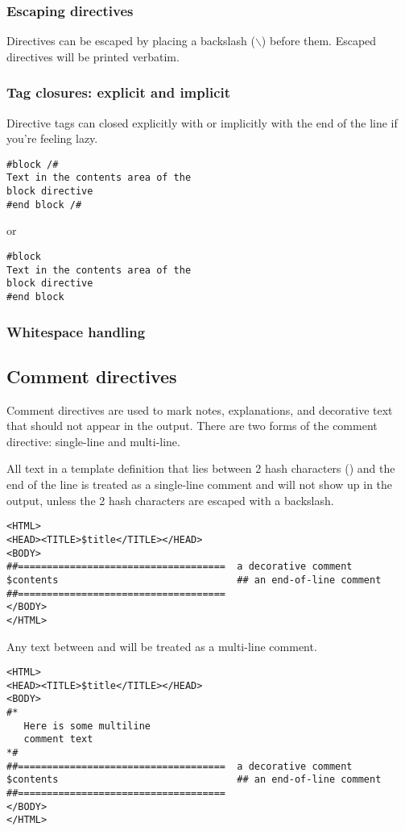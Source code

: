 \subsubsection{Escaping directives}
Directives can be escaped by placing a backslash ($\backslash$) before them.
Escaped directives will be printed verbatim.

\subsubsection{Tag closures: explicit and implicit}
Directive tags can closed explicitly with \code{/\#} or implicitly with the end
of the line if you're feeling lazy.
\begin{verbatim}
#block /#
Text in the contents area of the
block directive
#end block /#
\end{verbatim}
or
\begin{verbatim}
#block
Text in the contents area of the
block directive
#end block
\end{verbatim}

\subsubsection{Whitespace handling}


\subsection{Comment directives}

Comment directives are used to mark notes, explanations, and decorative text
that should not appear in the output.  There are two forms of the comment
directive: single-line and multi-line.

All text in a template definition that lies between 2 hash characters
(\code{\#\#}) and the end of the line is treated as a single-line comment and
will not show up in the output, unless the 2 hash characters are escaped with a
backslash.
\begin{verbatim}
<HTML>
<HEAD><TITLE>$title</TITLE></HEAD>
<BODY>
##====================================  a decorative comment
$contents                               ## an end-of-line comment
##====================================
</BODY>
</HTML>
\end{verbatim}

Any text between \code{\#*} and \code{*\#} will be treated as a multi-line
comment.
\begin{verbatim}
<HTML>
<HEAD><TITLE>$title</TITLE></HEAD>
<BODY>
#*
   Here is some multiline
   comment text
*#
##====================================  a decorative comment
$contents                               ## an end-of-line comment
##====================================
</BODY>
</HTML>
\end{verbatim}

